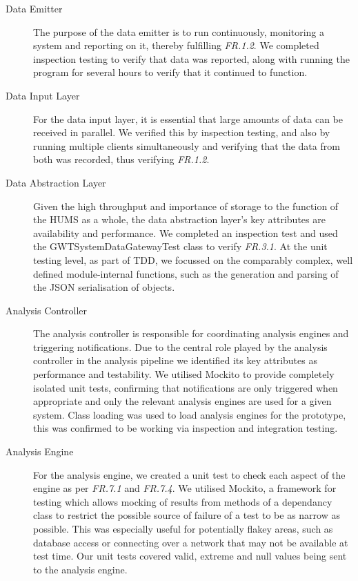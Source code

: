 \documentclass[10pt,a4paper]{article}
\newcommand{\frit}[1]{\textit{FR.#1}}
\begin{document}
\begin{description}

  \item[Data Emitter] The purpose of the data emitter is to run
    continuously, monitoring a system and reporting on it, thereby
    fulfilling \frit{1.2}. We completed inspection testing to verify 
    that data was reported, along with running the program for 
    several hours to verify that it continued to function.

  \item[Data Input Layer] For the data input layer, it is essential that large
    amounts of data can be received in parallel. We verified this by
    inspection testing, and also by running multiple clients simultaneously and
    verifying that the data from both was recorded, thus verifying \frit{1.2}.

  \item[Data Abstraction Layer] Given the high throughput and
    importance of storage to the function of the HUMS as a whole, the
    data abstraction layer's key attributes are availability and
    performance. We completed an inspection test and used the 
    GWTSystemDataGatewayTest class to verify \frit{3.1}. At the unit 
    testing level, as  part of TDD, we focussed on the comparably complex,
    well defined module-internal functions, such as the generation and 
    parsing of the JSON serialisation of objects.
    
  \item[Analysis Controller] The analysis controller is responsible for 
   coordinating analysis engines and triggering notifications. Due to 
   the central role played by the analysis controller in the analysis 
   pipeline we identified its key attributes as performance and testability. 
   We utilised Mockito to provide completely isolated unit tests, 
   confirming that notifications are only triggered when appropriate and  
   only the relevant analysis engines are used for a given system. 
   Class loading was used to load analysis engines for the prototype, 
   this was confirmed to be working via inspection and integration testing.
  
  \item[Analysis Engine]
   For the analysis engine, we created a unit test to check each aspect of the 
   engine as per \frit{7.1} and \frit{7.4}. We utilised Mockito, a framework 
   for testing which allows mocking of results from methods of a dependancy 
   class to restrict the possible source of failure of a test to be as narrow as 
   possible. This was especially useful for potentially flakey areas, such as 
   database access or connecting over a network that may not be available at 
   test time. Our unit tests covered valid, extreme and null values being sent 
   to the analysis engine.


\end{description}
\end{document}
